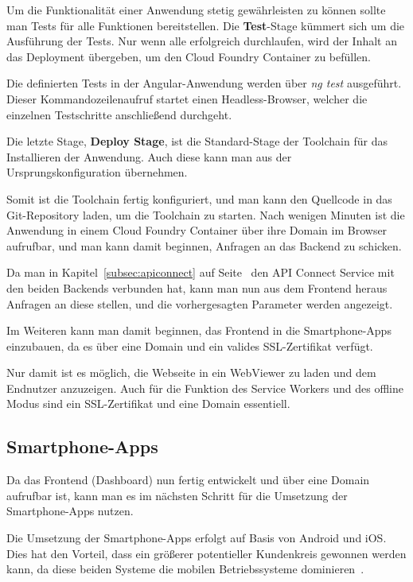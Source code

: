 Um die Funktionalität einer Anwendung stetig gewährleisten zu können sollte man Tests für alle Funktionen bereitstellen.
Die \textbf{Test}-Stage kümmert sich um die Ausführung der Tests. Nur wenn alle erfolgreich durchlaufen, wird der Inhalt
an das Deployment übergeben, um den Cloud Foundry Container zu befüllen.

Die definierten Tests in der Angular-Anwendung werden über \textit{ng test} ausgeführt. Dieser Kommandozeilenaufruf
startet einen Headless-Browser, welcher die einzelnen Testschritte anschließend durchgeht.

Die letzte Stage, \textbf{Deploy Stage}, ist die Standard-Stage der Toolchain für das Installieren der Anwendung. Auch
diese kann man aus der Ursprungskonfiguration übernehmen.

Somit ist die Toolchain fertig konfiguriert, und man kann den Quellcode in das Git-Repository laden, um die Toolchain zu
starten. Nach wenigen Minuten ist die Anwendung in einem Cloud Foundry Container über ihre Domain im Browser aufrufbar,
und man kann damit beginnen, Anfragen an das Backend zu schicken.

Da man in Kapitel~\ref{subsec:apiconnect} auf Seite~\pageref{subsec:apiconnect} den API Connect Service mit den beiden
Backends verbunden hat, kann man nun aus dem Frontend heraus Anfragen an diese stellen, und die vorhergesagten Parameter
werden angezeigt.

Im Weiteren kann man damit beginnen, das Frontend in die Smartphone-Apps einzubauen, da es über eine Domain und ein
valides SSL-Zertifikat verfügt.

Nur damit ist es möglich, die Webseite in ein WebViewer zu laden und dem Endnutzer anzuzeigen. Auch für die
Funktion des Service Workers und des offline Modus sind ein SSL-Zertifikat und eine Domain essentiell.

\subsection{Smartphone-Apps}
Da das Frontend (Dashboard) nun fertig entwickelt und über eine Domain aufrufbar ist, kann man es im nächsten Schritt
für die Umsetzung der Smartphone-Apps nutzen.

Die Umsetzung der Smartphone-Apps erfolgt auf Basis von Android und iOS. Dies hat den Vorteil, dass ein größerer
potentieller Kundenkreis gewonnen werden kann, da diese beiden Systeme die mobilen Betriebssysteme
dominieren~\cite{online_umsetzung_mobileos}.

